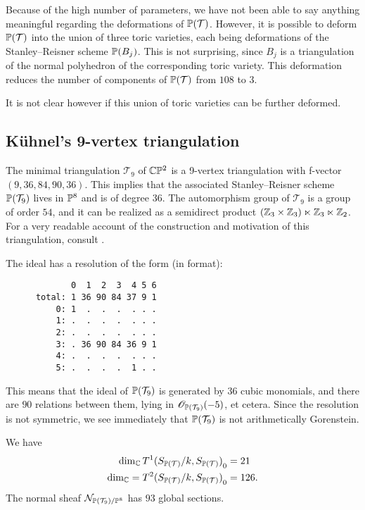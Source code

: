 Because of the high number of parameters, we have not been able to say anything meaningful regarding the deformations of $\P(\mathcal T)$. However, it is possible to deform $\P(\mathcal T)$ into the union of three toric varieties, each being deformations of the Stanley--Reisner scheme $\P(B_j)$. This is not surprising, since $B_j$ is a triangulation of the normal polyhedron of the corresponding toric variety. This deformation reduces the number of components of $\P(\mathcal T)$ from $108$ to $3$.

It is not clear however if this union of toric varieties can be further deformed.

\subsection{Kühnel's 9-vertex triangulation}

The minimal triangulation $\mathcal T_9$ of $\C \P^2$ is a 9-vertex triangulation with f-vector $(9,36,84,90,36)$. This implies that the associated Stanley--Reisner scheme $\P(\mathcal T_9)$ lives in $\P^8$ and is of degree $36$. The automorphism group of $\mathcal T_9$ is a group of order $54$, and it can be realized as a semidirect product $(\Z_3 \times \Z_3) \ltimes \Z_3 \ltimes \Z_2$. For a very readable account of the construction and motivation of this triangulation, consult \cite{kuhnel_9vertex}.

The ideal has a resolution of the form (in \MM format):

\begin{verbatim}
             0  1  2  3  4 5 6
      total: 1 36 90 84 37 9 1
          0: 1  .  .  .  . . .
          1: .  .  .  .  . . .
          2: .  .  .  .  . . .
          3: . 36 90 84 36 9 1
          4: .  .  .  .  . . .
          5: .  .  .  .  1 . .
\end{verbatim}

This means that the ideal of $\P(\mathcal T_9)$ is generated by $36$ cubic monomials, and there are $90$ relations between them, lying in $\OO_{\P(\mathcal T_9)}(-5)$, et cetera. Since the resolution is not symmetric, we see immediately that $\P(\mathcal T_9)$ is not arithmetically Gorenstein.

\begin{proposition}
We have
\begin{eqnarray*}
\dim_\C  {T^1(S_{\P(\mathcal T)}/k, S_{\P(\mathcal T)})}_0 &=  21 \\
\dim_\C = {T^2(S_{\P(\mathcal T)}/k, S_{\P(\mathcal T)})}_0 &= 126.
\end{eqnarray*}
The normal sheaf $\mathcal N_{\P(\mathcal T_9)/\P^{8}}$ has $93$ global sections.

\end{proposition}

